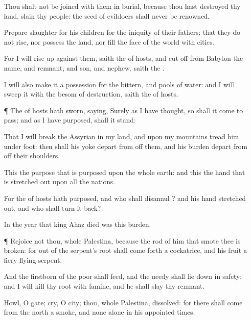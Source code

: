 {Thou shalt not be
joined with them in
burial, because thou hast
destroyed thy
land,
{}
slain thy
people: the
seed of
evildoers shall
never be
renowned.

Prepare
slaughter for his
children for the
iniquity of their
fathers; that they do
not
rise, nor
possess the
land, nor
fill the
face of the
world with
cities.

For I will rise
up against them,
saith the
{} of
hosts, and cut
off from
Babylon the
name, and
remnant, and
son, and
nephew,
saith the
{}.

I will also
make it a
possession for the
bittern, and
pools of
water: and I will
sweep it with the
besom of
destruction,
saith the
{} of
hosts.


\par }{\PP {}¶ The
{} of
hosts hath
sworn,
saying, Surely as I have
thought, so shall it come to pass; and as I have
purposed,
{} shall it
stand:

That I will
break the
Assyrian in my
land, and upon my
mountains tread him under
foot: then shall his
yoke
depart from off them, and his
burden
depart from off their
shoulders.

This
{} the
purpose that is
purposed upon the whole
earth: and this
{} the
hand that is stretched
out upon all the
nations.

For the
{} of
hosts hath
purposed, and who shall
disannul
{}? and his
hand
{} stretched
out, and who shall turn it
back?

In the
year that
king
Ahaz
died was this
burden.


\par }{\PP {}¶
Rejoice not thou, whole
Palestina, because the
rod of him that
smote thee is
broken: for out of the
serpent’s
root shall come
forth a
cockatrice, and his
fruit
{} a
fiery
flying
serpent.

And the
firstborn of the
poor shall
feed, and the
needy shall lie
down in
safety: and I will
kill thy
root with
famine, and he shall
slay thy
remnant.

Howl, O
gate;
cry, O
city; thou, whole
Palestina,
{}
dissolved: for there shall
come from the
north a
smoke, and none
{}
alone in his appointed
times.

}
